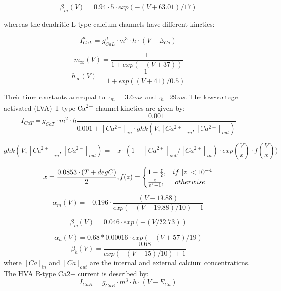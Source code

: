 \documentclass[12pt]{article}
\begin{document}
\begin{equation}
 \beta_m(V)=0.94 \cdot 5 \cdot exp(-(V+63.01)/17)
\end{equation}


whereas the dendritic L-type calcium channels have different kinetics: 


\begin{equation}
I_{CaL}^d= g_{CaL}^d \cdot m^3 \cdot h \cdot
(V-E_{Ca})
\end{equation}

\begin{equation}
m_{\infty}(V)=\frac {1}{1+exp(-(V+37))}
\end{equation}
\begin{equation}
h_{\infty}(V)=\frac {1}{1+exp( (V+41)/0.5)}
\end{equation}

Their time constants are equal to $\tau_m$ = 3.6\textit{ms} and $\tau_h$=29\textit{ms}. The low-voltage activated (LVA) T-type Ca\textsuperscript{2+} channel kinetics are given by:
\begin{equation}
I_{CaT} = g_{CaT}\cdot m^2\cdot h\frac{0.001}{0.001+[Ca^{2+}]_{in} \cdot ghk(V,[Ca^{2+}]_{in},[Ca^{2+}]_{out})}
\end{equation}

\begin{equation}
ghk(V, [Ca^{2+}]_{in}, [Ca^{2+}]_{out})=-x\cdot
(1 - [Ca^{2+}]_{out}/[Ca^{2+}]_{in}) \cdot exp(\frac {V}{x})\cdot f(\frac {V}{x}))
\end{equation}

\begin{equation}
x=\frac{0.0853\cdot (T+degC)}{2}, \\
f(z) = \begin{cases} 1-\frac {z}{2}, & if \ |z|<10^{-4} \\ \frac z{e^z-1}, & \  otherwise \ \end{cases}
\end{equation}

\begin{equation}
\alpha_m(V)=-0.196\cdot \frac{(V-19.88)}{exp(-(V-19.88)/10)-1} 
\end{equation}

\begin{equation}
\beta_m(V) = 0.046\cdot exp(-(V/22.73))
\end{equation}

\begin{equation}
\alpha_h(V)=0.68 * 0.00016\cdot exp(-(V+57)/19)
\end{equation}
\begin{equation}
\beta_h(V)=\frac {0.68}{exp(-(V-15)/10)+1}
\end{equation}
where $[Ca]_{in}$ and $[Ca]_{out}$ are the internal and external calcium concentrations. The HVA R-type Ca2+ current is described by:
\begin{equation}
I_{CaR}=\bar g_{CaR}\cdot m^3\cdot h\cdot (V-E_{Ca})
\end{equation}
\end{document}
